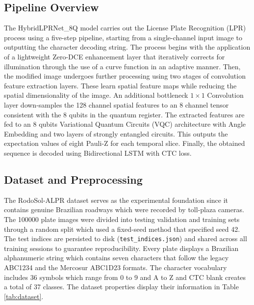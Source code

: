 \documentclass[preprint,12pt]{elsarticle}
\begin{document}
\subsection{Pipeline Overview}
The HybridLPRNet\_8Q model carries out the License Plate Recognition (LPR) process using a five-step pipeline, starting from a single-channel input image to outputting the character decoding string. The process begins with the application of a lightweight Zero-DCE enhancement layer that iteratively corrects for illumination through the use of a curve function in an adaptive manner. Then, the modified image undergoes further processing using two stages of convolution feature extraction layers. These learn spatial feature maps while reducing the spatial dimensionality of the image. An additional bottleneck $1\times 1$ Convolution layer down-samples the 128 channel spatial features to an 8 channel tensor consistent with the 8 qubits in the quantum register. The extracted features are fed to an 8 qubits Variational Quantum Circuits (VQC) architecture with Angle Embedding and two layers of strongly entangled circuits. This outputs the expectation values of eight Pauli-Z for each temporal slice. Finally, the obtained sequence is decoded using Bidirectional LSTM with CTC loss.

\subsection{Dataset and Preprocessing}
The RodoSol-ALPR dataset \cite{b6} serves as the experimental foundation since it contains genuine Brazilian roadways which were recorded by toll-plaza cameras. The 100000 plate images were divided into testing validation and training sets through a random split which used a fixed-seed method that specified seed 42. The test indices are persisted to disk (\texttt{test\_indices.json}) and shared across all training sessions to guarantee reproducibility. Every plate displays a Brazilian alphanumeric string which contains seven characters that follow the legacy ABC1234 and the Mercosur ABC1D23 formats. The character vocabulary includes 36 symbols which range from 0 to 9 and A to Z and CTC blank creates a total of 37 classes. The dataset properties display their information in Table \ref{tab:dataset}.
\end{document}
